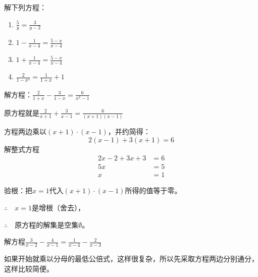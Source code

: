 \begin{ex}
   解下列方程：
   \begin{multicols}{2}
       \begin{enumerate}
        \item $\frac{5}{y}=\frac{3}{y-2}$
        \item $1-\frac{1}{x-4}=\frac{5-x}{x-4}$
        \item $1+\frac{1}{x-4}=\frac{5-x}{x-4}$
        \item $\frac{2}{1-x^2}=\frac{1}{1+x}+1$
    \end{enumerate}
   \end{multicols}
   
\end{ex}

\begin{example}
    解方程：$\frac{2}{1+x}-\frac{3}{1-x}=\frac{6}{x^2-1}$
\end{example}

\begin{solution}
原方程就是$\frac{2}{x+1}+\frac{3}{x-1}=\frac{6}{(x+1)(x-1)}$

方程两边乘以$(x+1)\cdot (x-1)$，并约简得：
\[2(x-1)+3(x+1)=6\]
解整式方程
\[\begin{split}
    2x-2+3x+3&=6\\
    5x&=5\\
    x&=1
\end{split}\]
 
验根：把$x=1$代入$(x+1)\cdot (x-1)$所得的值等于零。

$\therefore\quad x=1$是增根（舍去），

$\therefore\quad$原方程的解集是空集$\emptyset$。
\end{solution}



\begin{example}
解方程$\frac{3}{x-2}-\frac{4}{x-1}=\frac{1}{x-4}-\frac{2}{x-3}$
\end{example}

\begin{analyze}
如果开始就乘以分母的最低公倍式，这样很复杂，所以先采取方程两边分别通分，这样比较简便。
\end{analyze}

